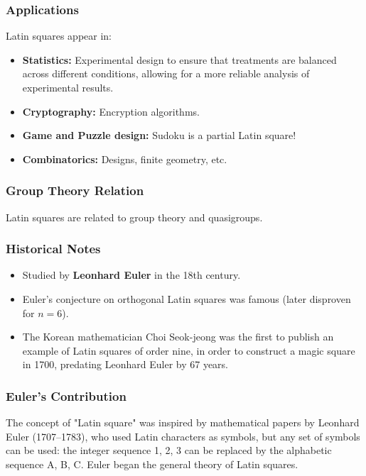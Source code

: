 \documentclass{beamer}
\begin{document}
\begin{frame}
\frametitle{Applications}
Latin squares appear in:
\begin{itemize}
  \item \textbf{Statistics:} Experimental design to ensure that treatments are balanced across different conditions, allowing for a more reliable analysis of experimental results.
  \item \textbf{Cryptography:} Encryption algorithms.
  \item \textbf{Game and Puzzle design:} Sudoku is a partial Latin square!
  \item \textbf{Combinatorics:} Designs, finite geometry, etc.
\end{itemize}
\end{frame}

\begin{frame}
\frametitle{Group Theory Relation}
Latin squares are related to group theory and quasigroups.
\end{frame}

\begin{frame}
\frametitle{Historical Notes}
\begin{itemize}
  \item Studied by \textbf{Leonhard Euler} in the 18th century.
  \item Euler's conjecture on orthogonal Latin squares was famous (later disproven for $n=6$).
  \item The Korean mathematician Choi Seok-jeong was the first to publish an example of Latin squares of order nine, in order to construct a magic square in 1700, predating Leonhard Euler by 67 years.
\end{itemize}
\end{frame}

\begin{frame}
\frametitle{Euler's Contribution}
The concept of "Latin square" was inspired by mathematical papers by Leonhard Euler (1707–1783), who used Latin characters as symbols, but any set of symbols can be used: the integer sequence 1, 2, 3 can be replaced by the alphabetic sequence A, B, C.
Euler began the general theory of Latin squares.
\end{frame}
\end{document}
